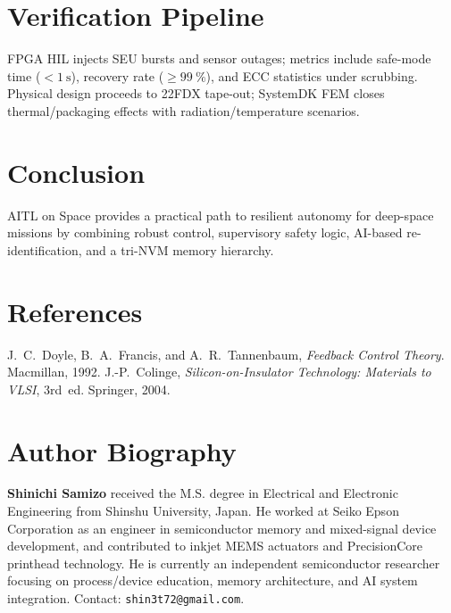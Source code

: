 \documentclass[conference]{IEEEtran}
\begin{document}
\section{Verification Pipeline}
FPGA HIL injects SEU bursts and sensor outages; metrics include safe-mode time ($<\SI{1}{\second}$), recovery rate ($\ge\SI{99}{\percent}$), and ECC statistics under scrubbing. Physical design proceeds to 22FDX tape-out; SystemDK FEM closes thermal/packaging effects with radiation/temperature scenarios.

\section{Conclusion}
AITL on Space provides a practical path to resilient autonomy for deep-space missions by combining robust control, supervisory safety logic, AI-based re-identification, and a tri-NVM memory hierarchy.

\FloatBarrier
\section*{References}
\begin{thebibliography}{99}
J.~C.~Doyle, B.~A.~Francis, and A.~R.~Tannenbaum, \emph{Feedback Control Theory}. Macmillan, 1992.
J.-P.~Colinge, \emph{Silicon-on-Insulator Technology: Materials to VLSI}, 3rd~ed. Springer, 2004.
\end{thebibliography}

\section*{Author Biography}
\textbf{Shinichi Samizo} received the M.S. degree in Electrical and Electronic Engineering from Shinshu University, Japan. He worked at Seiko Epson Corporation as an engineer in semiconductor memory and mixed-signal device development, and contributed to inkjet MEMS actuators and PrecisionCore printhead technology. He is currently an independent semiconductor researcher focusing on process/device education, memory architecture, and AI system integration. Contact: \texttt{shin3t72@gmail.com}.
\end{document}
